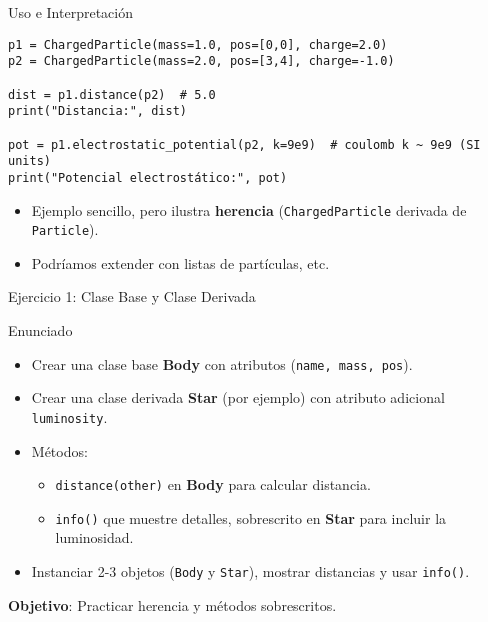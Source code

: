 \documentclass[10pt]{beamer}
\begin{document}
\begin{frame}[fragile]{Uso e Interpretación}
\begin{verbatim}
p1 = ChargedParticle(mass=1.0, pos=[0,0], charge=2.0)
p2 = ChargedParticle(mass=2.0, pos=[3,4], charge=-1.0)

dist = p1.distance(p2)  # 5.0
print("Distancia:", dist)

pot = p1.electrostatic_potential(p2, k=9e9)  # coulomb k ~ 9e9 (SI units)
print("Potencial electrostático:", pot)
\end{verbatim}
\begin{itemize}
  \item Ejemplo sencillo, pero ilustra \textbf{herencia} (\texttt{ChargedParticle} derivada de \texttt{Particle}).
  \item Podríamos extender con listas de partículas, etc.
\end{itemize}
\end{frame}

\begin{frame}{Ejercicio 1: Clase Base y Clase Derivada}
  \begin{block}{Enunciado}
    \begin{itemize}
      \item Crear una clase base \textbf{Body} con atributos (\texttt{name, mass, pos}).
      \item Crear una clase derivada \textbf{Star} (por ejemplo) con atributo adicional \texttt{luminosity}.
      \item Métodos:
        \begin{itemize}
          \item \texttt{distance(other)} en \textbf{Body} para calcular distancia.
          \item \texttt{info()} que muestre detalles, sobrescrito en \textbf{Star} para incluir la luminosidad.
        \end{itemize}
      \item Instanciar 2-3 objetos (\texttt{Body} y \texttt{Star}), mostrar distancias y usar \texttt{info()}.
    \end{itemize}
  \end{block}
  \textbf{Objetivo}: Practicar herencia y métodos sobrescritos.
\end{frame}
\end{document}
